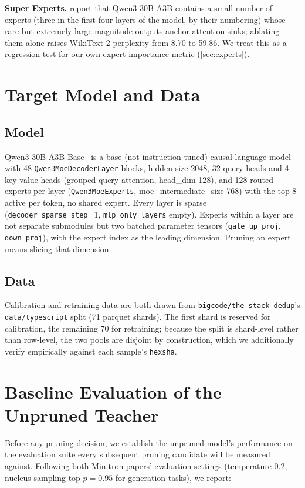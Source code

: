 \documentclass{article}
\theoremstyle{plain}
\theoremstyle{definition}
\theoremstyle{remark}
\begin{document}
\textbf{Super Experts.} \citet{superexperts2025} report that Qwen3-30B-A3B
contains a small number of experts (three in the first four layers of the
model, by their numbering) whose rare but extremely large-magnitude outputs
anchor attention sinks; ablating them alone raises WikiText-2 perplexity
from 8.70 to 59.86. We treat this as a regression test for our own expert
importance metric (\cref{sec:experts}).

\section{Target Model and Data}
\label{sec:model-data}

\subsection{Model}
Qwen3-30B-A3B-Base~\cite{qwen3moe} is a base (not instruction-tuned) causal
language model with 48 \texttt{Qwen3MoeDecoderLayer} blocks, hidden size
2048, 32 query heads and 4 key-value heads (grouped-query attention,
head\_dim 128), and 128 routed experts per layer (\texttt{Qwen3MoeExperts},
moe\_intermediate\_size 768) with the top 8 active per token, no shared
expert. Every layer is sparse (\texttt{decoder\_sparse\_step}=1,
\texttt{mlp\_only\_layers} empty). Experts within a layer are not separate
submodules but two batched parameter tensors
(\texttt{gate\_up\_proj}, \texttt{down\_proj}), with the expert index as the
leading dimension. Pruning an expert means slicing that dimension.

\subsection{Data}
Calibration and retraining data are both drawn from
\texttt{bigcode/the-stack-dedup}'s \cite{stackdedup} \texttt{data/typescript}
split (71 parquet shards). The first shard is reserved for calibration, the remaining
70 for retraining; because the split is shard-level rather than row-level,
the two pools are disjoint by construction, which we additionally verify
empirically against each sample's \texttt{hexsha}.

\section{Baseline Evaluation of the Unpruned Teacher}
\label{sec:baseline}

Before any pruning decision, we establish the unpruned model's performance
on the evaluation suite every subsequent pruning candidate will be measured
against. Following both Minitron papers' evaluation settings (temperature
0.2, nucleus sampling top-$p=0.95$ for generation tasks), we report:
\end{document}

